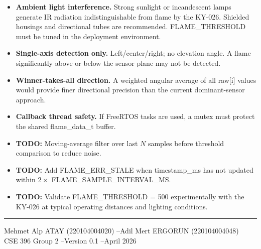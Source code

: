 \documentclass[12pt]{article}
\newcommand{\fn}[1]{{\footnotesize\ttfamily #1}}
\begin{document}
\begin{itemize}
  \item \textbf{Ambient light interference.} Strong sunlight or incandescent lamps generate IR radiation indistinguishable from flame by the KY-026. Shielded housings and directional tubes are recommended. \fn{FLAME\_THRESHOLD} must be tuned in the deployment environment.
  \item \textbf{Single-axis detection only.} Left/center/right; no elevation angle. A flame significantly above or below the sensor plane may not be detected.
  \item \textbf{Winner-takes-all direction.} A weighted angular average of all \fn{raw[i]} values would provide finer directional precision than the current dominant-sensor approach.
  \item \textbf{Callback thread safety.} If FreeRTOS tasks are used, a mutex must protect the shared \fn{flame\_data\_t} buffer.
  \item \textbf{TODO:} Moving-average filter over last $N$ samples before threshold comparison to reduce noise.
  \item \textbf{TODO:} Add \fn{FLAME\_ERR\_STALE} when \fn{timestamp\_ms} has not updated within $2 \times$ \fn{FLAME\_SAMPLE\_INTERVAL\_MS}.
  \item \textbf{TODO:} Validate \fn{FLAME\_THRESHOLD = 500} experimentally with the KY-026 at typical operating distances and lighting conditions.
\end{itemize}

\vfill
{\color{headerblue}\rule{\linewidth}{1.5pt}}
\begin{center}
  \small
  Mehmet Alp ATAY (220104004020) \quad--\quad Adil Mert ERGORUN (220104004048)\\
  CSE 396 Group 2 \quad--\quad Version 0.1 \quad--\quad April 2026
\end{center}
\end{document}
